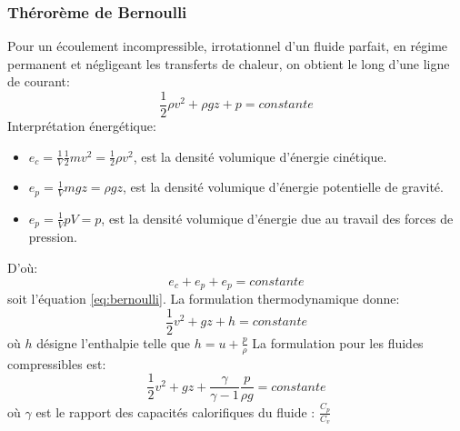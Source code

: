 \documentclass[10pt,a4paper]{article}
\begin{document}
\subsubsection{Thérorème de Bernoulli\cite{bernoulli}}
Pour un écoulement incompressible, irrotationnel d'un fluide parfait, en régime permanent et négligeant les transferts de chaleur, on obtient le long d'une ligne de courant:
\begin{equation}
\frac{1}{2}\rho v^{2} + \rho g z + p = constante
\label{eq:bernoulli}
\end{equation}
Interprétation énergétique:
\begin{itemize}
\item $e_{c} = \frac{1}{V}\frac{1}{2}mv^{2} = \frac{1}{2}\rho v^{2}$, est la densité volumique d'énergie cinétique.
\item $e_{p} = \frac{1}{V}mgz = \rho gz$, est la densité volumique d'énergie potentielle de gravité.
\item $e_{p} = \frac{1}{V} pV = p$, est la densité volumique d'énergie due au travail des forces de pression.
\end{itemize}
D'où:
\[ e_{c} + e_{p} + e_{p} = constante \]
soit l'équation \ref{eq:bernoulli}.
La formulation thermodynamique donne:
\begin{equation}
\frac{1}{2}v^{2} + gz + h = constante
\end{equation}
où $h$ désigne l'enthalpie telle que $h = u + \frac{p}{\rho}$
La formulation pour les fluides compressibles est:
\begin{equation}
\frac{1}{2}v^{2} + gz + \frac{\gamma}{\gamma - 1}\frac{p}{\rho g} = constante
\end{equation}
où $\gamma$ est le rapport des capacités calorifiques du fluide : $\frac{C_{p}}{C_{v}}$

\end{document}
